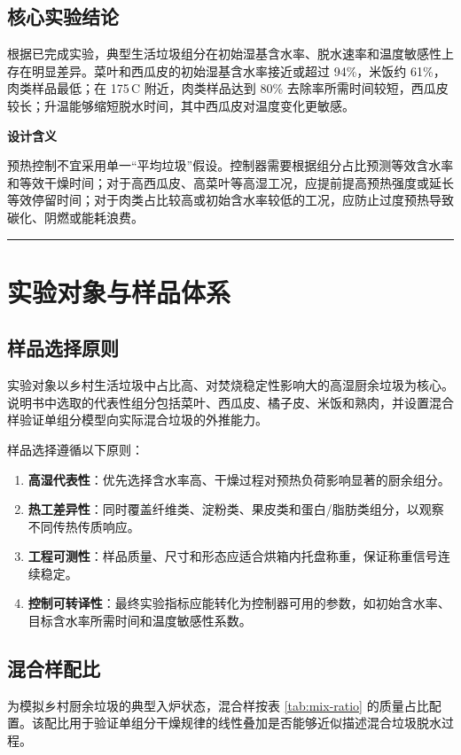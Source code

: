 \documentclass[UTF8,openany,zihao=-4,oneside]{ctexbook}
\newcommand{\manualdivider}{\par\vspace{0.6em}\noindent\textcolor{FGLine}{\rule{\linewidth}{0.7pt}}\vspace{0.6em}\par}
\newcommand{\warnbox}[2]{\begin{tcolorbox}[enhanced,colback=FGOrange!6,colframe=FGOrange!55,boxrule=0.5pt,arc=1.5mm,left=4mm,right=4mm,top=3mm,bottom=3mm]\sffamily\textbf{\color{FGDeep}#1}\par\vspace{0.25em}\color{FGText}#2\end{tcolorbox}}
\begin{document}
\section{核心实验结论}

根据已完成实验，典型生活垃圾组分在初始湿基含水率、脱水速率和温度敏感性上存在明显差异。菜叶和西瓜皮的初始湿基含水率接近或超过 94\%，米饭约 61\%，肉类样品最低；在 175\,\textdegree C 附近，肉类样品达到 80\% 去除率所需时间较短，西瓜皮较长；升温能够缩短脱水时间，其中西瓜皮对温度变化更敏感。

\warnbox{设计含义}{预热控制不宜采用单一“平均垃圾”假设。控制器需要根据组分占比预测等效含水率和等效干燥时间；对于高西瓜皮、高菜叶等高湿工况，应提前提高预热强度或延长等效停留时间；对于肉类占比较高或初始含水率较低的工况，应防止过度预热导致碳化、阴燃或能耗浪费。}

\manualdivider

\chapter{实验对象与样品体系}

\section{样品选择原则}

实验对象以乡村生活垃圾中占比高、对焚烧稳定性影响大的高湿厨余垃圾为核心。说明书中选取的代表性组分包括菜叶、西瓜皮、橘子皮、米饭和熟肉，并设置混合样验证单组分模型向实际混合垃圾的外推能力。

样品选择遵循以下原则：

\begin{enumerate}
\item \textbf{高湿代表性}：优先选择含水率高、干燥过程对预热负荷影响显著的厨余组分。
\item \textbf{热工差异性}：同时覆盖纤维类、淀粉类、果皮类和蛋白/脂肪类组分，以观察不同传热传质响应。
\item \textbf{工程可测性}：样品质量、尺寸和形态应适合烘箱内托盘称重，保证称重信号连续稳定。
\item \textbf{控制可转译性}：最终实验指标应能转化为控制器可用的参数，如初始含水率、目标含水率所需时间和温度敏感性系数。
\end{enumerate}

\section{混合样配比}

为模拟乡村厨余垃圾的典型入炉状态，混合样按表 \ref{tab:mix-ratio} 的质量占比配置。该配比用于验证单组分干燥规律的线性叠加是否能够近似描述混合垃圾脱水过程。
\end{document}
